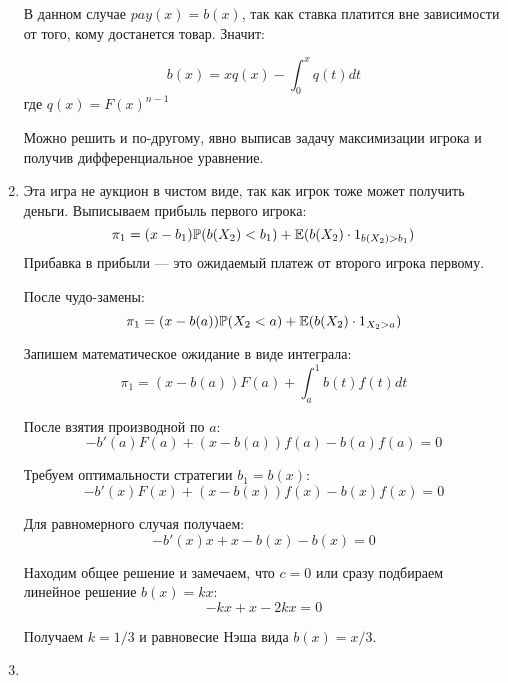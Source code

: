 \begin{enumerate}
В данном случае $ pay(x)=b(x) $, так как ставка платится вне зависимости от того, кому достанется товар. Значит:

\begin{equation}
\label{NE_all_pay}
b(x)=xq(x)-\int_{0}^{x}q(t)dt
\end{equation}
где $ q(x)=F(x)^{n-1} $

Можно решить и по-другому, явно выписав задачу максимизации игрока и получив дифференциальное уравнение.


\item Эта игра не аукцион в чистом виде, так как игрок тоже может получить деньги.
Выписываем прибыль первого игрока:
\begin{equation}
\pi_{1}=(x-b_{1})\mathbb{P}(b(X_{2})<b_{1})+\mathbb{E}(b(X_{2})\cdot 1_{b(X_{2})>b_{1}})
\end{equation}
Прибавка в прибыли — это ожидаемый платеж от второго игрока первому.

После чудо-замены:
\begin{equation}
\pi_{1}=(x-b(a))\mathbb{P}(X_{2}<a)+\mathbb{E}(b(X_{2})\cdot 1_{X_{2}>a})
\end{equation}

Запишем математическое ожидание в виде интеграла:
\begin{equation}
\pi_{1}=(x-b(a))F(a)+\int_{a}^{1}b(t)f(t)dt
\end{equation}

После взятия производной по $ a $:
\begin{equation}
-b'(a)F(a)+(x-b(a))f(a)-b(a)f(a)=0
\end{equation}

Требуем оптимальности стратегии  $ b_{1}=b(x) $:
\begin{equation}
-b'(x)F(x)+(x-b(x))f(x)-b(x)f(x)=0
\end{equation}

Для равномерного случая получаем:
\begin{equation}
-b'(x)x+x-b(x)-b(x)=0
\end{equation}

Находим общее решение и замечаем, что $ c=0 $ или сразу подбираем линейное решение $ b(x)=kx $:
\begin{equation}
-kx+x-2kx=0
\end{equation}

Получаем $ k=1/3 $ и равновесие Нэша вида $ b(x)=x/3 $.



\item


\end{enumerate}
